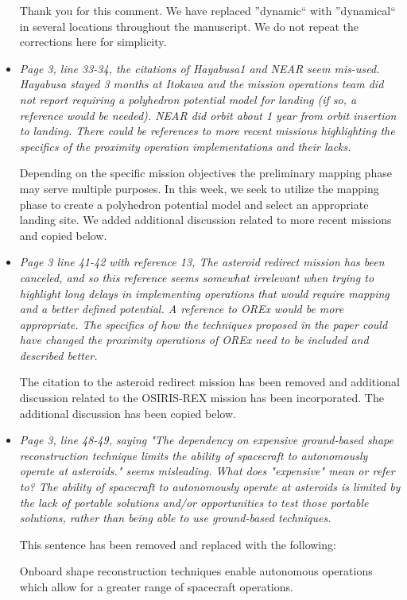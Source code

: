 \documentclass[11pt]{article}
\newcommand{\comment}[1]{\item \itshape #1 \normalfont}
\begin{document}
\begin{itemize}
Thank you for this comment. 
We have replaced ''dynamic`` with ''dynamical`` in several locations throughout the manuscript.
We do not repeat the corrections here for simplicity.

\comment{
Page 3, line 33-34, the citations of Hayabusa1 and NEAR seem mis-used. Hayabusa stayed 3 months at Itokawa and the mission operations team did not report requiring a polyhedron potential model for landing (if so, a reference would be needed). 
NEAR did orbit about 1 year from orbit insertion to landing.
There could be references to more recent missions highlighting the specifics of the proximity operation implementations and their lacks.
}

Depending on the specific mission objectives the preliminary mapping phase may serve multiple purposes. 
In this week, we seek to utilize the mapping phase to create a polyhedron potential model and select an appropriate landing site. 
We added additional discussion related to more recent missions and copied below.



\comment{
Page 3 line 41-42 with reference 13, The asteroid redirect mission has been canceled, and so this reference seems somewhat irrelevant when trying to highlight long delays in implementing operations that would require mapping and a better defined potential.
A reference to OREx would be more appropriate.
The specifics of how the techniques proposed in the paper could have changed the proximity operations of OREx need to be included and described better.
}

The citation to the asteroid redirect mission has been removed and additional discussion related to the OSIRIS-REX mission has been incorporated.
The additional discussion has been copied below.

\comment{
Page 3, line 48-49, saying "The dependency on expensive ground-based shape reconstruction technique limits the ability of spacecraft to autonomously operate at asteroids." seems misleading.
What does "expensive" mean or refer to? The ability of spacecraft to autonomously operate at asteroids is limited by the lack of portable solutions and/or opportunities to test those portable solutions, rather than being able to use ground-based techniques.
}

This sentence has been removed and replaced with the following:

Onboard shape reconstruction techniques enable autonomous operations which allow for a greater range of spacecraft operations.



\end{itemize}
\end{document}
